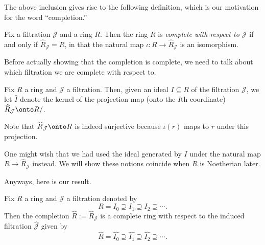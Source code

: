 The above inclusion gives rise to the following definition, which is our motivation for the word ``completion.''
\begin{definition}[Complete]
	Fix a filtration $\mathcal J$ and a ring $R$. Then the ring $R$ is \textit{complete with respect to $\mathcal J$} if and only if $\widehat R_\mathcal J=R$, in that the natural map $\iota:R\to\widehat R_\mathcal J$ is an isomorphism.
\end{definition}
Before actually showing that the completion is complete, we need to talk about which filtration we are complete with respect to.
\begin{notation}
	Fix $R$ a ring and $\mathcal J$ a filtration. Then, given an ideal $I\subseteq R$ of the filtration $\mathcal J$, we let $\widehat I$ denote the kernel of the projection map (onto the $I$th coordinate) $\widehat R_\mathcal J\onto R/\textit{}$.
\end{notation}
Note that $\widehat R_\mathcal J\onto R$ is indeed surjective because $\iota(r)$ maps to $r$ under this projection.
\begin{remark}
	One might wish that we had used the ideal generated by $I$ under the natural map $R\to\widehat R_\mathcal J$ instead. We will show these notions coincide when $R$ is Noetherian later.
\end{remark}
Anyways, here is our result.
\begin{prop} \label{prop:completeiscomplete}
	Fix $R$ a ring and $\mathcal J$ a filtration denoted by
	\[R=I_0\supseteq I_1\supseteq I_2\supseteq\cdots.\]
	Then the completion $\widehat R:=\widehat R_\mathcal J$ is a complete ring with respect to the induced filtration $\widehat{\mathcal J}$ given by
	\[\widehat R=\widehat{I_0}\supseteq \widehat{I_1}\supseteq \widehat{I_2}\supseteq\cdots.\]
\end{prop}
